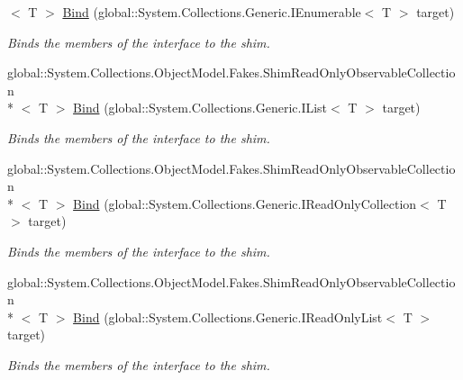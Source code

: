 \begin{DoxyCompactItemize}
$<$ T $>$ \hyperlink{class_system_1_1_collections_1_1_object_model_1_1_fakes_1_1_shim_read_only_observable_collection_3_01_t_01_4_affa2706fb4e185eab3a4111a7c3bc334}{Bind} (global\-::\-System.\-Collections.\-Generic.\-I\-Enumerable$<$ T $>$ target)
\begin{DoxyCompactList}\small\item\em Binds the members of the interface to the shim.\end{DoxyCompactList}\item 
global\-::\-System.\-Collections.\-Object\-Model.\-Fakes.\-Shim\-Read\-Only\-Observable\-Collection\\*
$<$ T $>$ \hyperlink{class_system_1_1_collections_1_1_object_model_1_1_fakes_1_1_shim_read_only_observable_collection_3_01_t_01_4_a1b63de6626fd0f2dff567a5c08cfff04}{Bind} (global\-::\-System.\-Collections.\-Generic.\-I\-List$<$ T $>$ target)
\begin{DoxyCompactList}\small\item\em Binds the members of the interface to the shim.\end{DoxyCompactList}\item 
global\-::\-System.\-Collections.\-Object\-Model.\-Fakes.\-Shim\-Read\-Only\-Observable\-Collection\\*
$<$ T $>$ \hyperlink{class_system_1_1_collections_1_1_object_model_1_1_fakes_1_1_shim_read_only_observable_collection_3_01_t_01_4_acaa18ea5efd11990f59ae66d9d8b6e14}{Bind} (global\-::\-System.\-Collections.\-Generic.\-I\-Read\-Only\-Collection$<$ T $>$ target)
\begin{DoxyCompactList}\small\item\em Binds the members of the interface to the shim.\end{DoxyCompactList}\item 
global\-::\-System.\-Collections.\-Object\-Model.\-Fakes.\-Shim\-Read\-Only\-Observable\-Collection\\*
$<$ T $>$ \hyperlink{class_system_1_1_collections_1_1_object_model_1_1_fakes_1_1_shim_read_only_observable_collection_3_01_t_01_4_a16463056aa1a2018522d36ed76f90cbf}{Bind} (global\-::\-System.\-Collections.\-Generic.\-I\-Read\-Only\-List$<$ T $>$ target)
\begin{DoxyCompactList}\small\item\em Binds the members of the interface to the shim.\end{DoxyCompactList}\end{DoxyCompactItemize}
